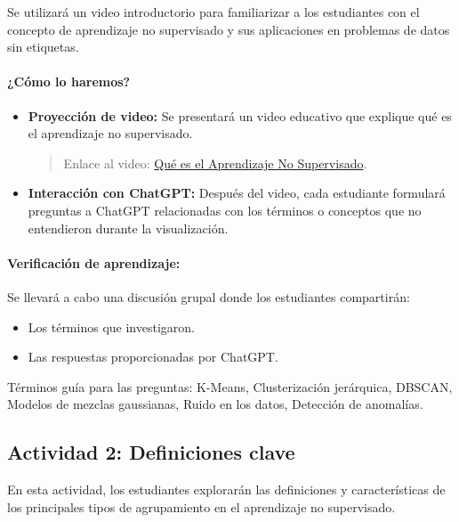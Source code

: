\documentclass[a4,11pt]{aleph-notas}
\begin{document}
Se utilizará un video introductorio para familiarizar a los estudiantes con el concepto de aprendizaje no supervisado y sus aplicaciones en problemas de datos sin etiquetas.

\paragraph{¿Cómo lo haremos?}  
\begin{itemize}[leftmargin=*]
    \item \textbf{Proyección de video:}  
    Se presentará un video educativo que explique qué es el aprendizaje no supervisado.
    \begin{quote}
        Enlace al video: \href{https://www.youtube.com/watch?v=WM7XaTyX7O8}{Qué es el Aprendizaje No Supervisado}.
    \end{quote}
    \item \textbf{Interacción con ChatGPT:}  
    Después del video, cada estudiante formulará preguntas a ChatGPT relacionadas con los términos o conceptos que no entendieron durante la visualización.
\end{itemize}

\paragraph{Verificación de aprendizaje:}  
Se llevará a cabo una discusión grupal donde los estudiantes compartirán:
\begin{itemize}[leftmargin=*]
    \item Los términos que investigaron.
    \item Las respuestas proporcionadas por ChatGPT.
\end{itemize}
Términos guía para las preguntas: K-Means, Clusterización jerárquica, DBSCAN, Modelos de mezclas gaussianas, Ruido en los datos, Detección de anomalías.

\subsection*{Actividad 2: Definiciones clave}

En esta actividad, los estudiantes explorarán las definiciones y características de los principales tipos de agrupamiento en el aprendizaje no supervisado.
\end{document}
